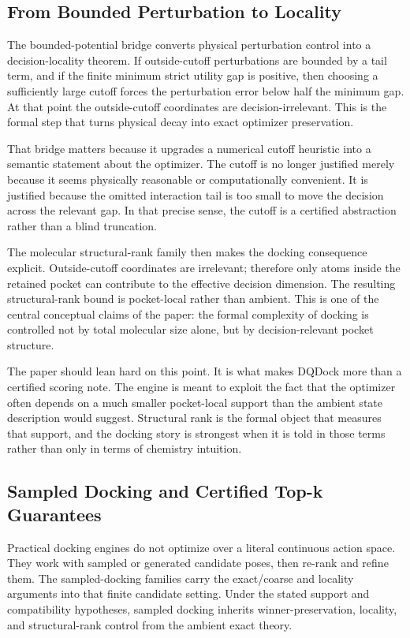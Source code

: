 \subsection{From Bounded Perturbation to Locality}

The bounded-potential bridge  converts physical perturbation control into a decision-locality theorem. If outside-cutoff perturbations are bounded by a tail term, and if the finite minimum strict utility gap is positive, then choosing a sufficiently large cutoff forces the perturbation error below half the minimum gap. At that point the outside-cutoff coordinates are decision-irrelevant. This is the formal step that turns physical decay into exact optimizer preservation.

That bridge matters because it upgrades a numerical cutoff heuristic into a semantic statement about the optimizer. The cutoff is no longer justified merely because it seems physically reasonable or computationally convenient. It is justified because the omitted interaction tail is too small to move the decision across the relevant gap. In that precise sense, the cutoff is a certified abstraction rather than a blind truncation.

The molecular structural-rank family  then makes the docking consequence explicit. Outside-cutoff coordinates are irrelevant; therefore only atoms inside the retained pocket can contribute to the effective decision dimension. The resulting structural-rank bound is pocket-local rather than ambient. This is one of the central conceptual claims of the paper: the formal complexity of docking is controlled not by total molecular size alone, but by decision-relevant pocket structure.

The paper should lean hard on this point. It is what makes DQDock more than a certified scoring note. The engine is meant to exploit the fact that the optimizer often depends on a much smaller pocket-local support than the ambient state description would suggest. Structural rank is the formal object that measures that support, and the docking story is strongest when it is told in those terms rather than only in terms of chemistry intuition.

\subsection{Sampled Docking and Certified Top-k Guarantees}

Practical docking engines do not optimize over a literal continuous action space. They work with sampled or generated candidate poses, then re-rank and refine them. The sampled-docking families  carry the exact/coarse and locality arguments into that finite candidate setting. Under the stated support and compatibility hypotheses, sampled docking inherits winner-preservation, locality, and structural-rank control from the ambient exact theory.

